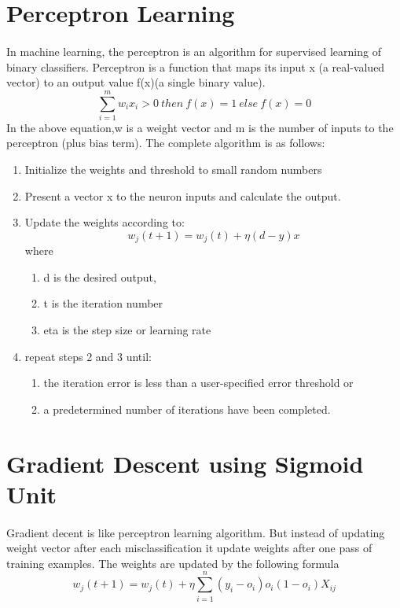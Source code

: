 \documentclass[]{report}
\begin{document}
\section{Perceptron Learning}
\paragraph{}In machine learning, the perceptron is an algorithm for supervised learning of binary classifiers.  Perceptron is a function that maps its input x (a real-valued vector) to an output value f(x)(a single binary value). 
\begin{equation}\label{Perceptron Equation}
\sum_{i=1}^{m}w_{i}x_{i} >0~ then~ f(x) = 1~ else~ f(x) = 0
\end{equation}
In the above equation,w is a weight vector and m is the number of inputs to the perceptron (plus bias term).
The complete algorithm is as follows:
\begin{enumerate}
	\item Initialize the weights and threshold to small random numbers
	\item Present a vector x to the neuron inputs and calculate the output.
	\item Update the weights according to:
	\begin{equation}\label{Perceptron Weight Update equation}
	w_{j}(t+1)=w_{j}(t)+\eta(d-y)x
	\end{equation}
	where
	\begin{enumerate}
		\item d is the desired output,
		\item t is the iteration number
		\item eta is the step size or learning rate
	\end{enumerate}
\item repeat steps 2 and 3 until:
\begin{enumerate}
	\item the iteration error is less than a user-specified error threshold or
	\item a predetermined number of iterations have been completed.
\end{enumerate}
\end{enumerate}

\section{Gradient Descent using Sigmoid Unit}
\paragraph{}Gradient decent is like perceptron learning algorithm. But instead of updating weight vector after each misclassification it update weights after one pass of training examples. The weights are updated by the following formula
\begin{equation}\label{Weight update in sigmoid function}
w_{j}(t+1)= w_{j}(t)+\eta\sum_{i=1}^{n}(y_{i}-o_{i})o_i(1-o_i)X_{ij}
\end{equation}
\end{document}
